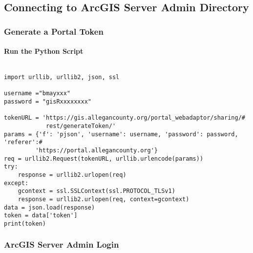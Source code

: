%
%
%
%
% 
%
\subsection{Connecting to ArcGIS Server Admin Directory}

\subsubsection{Generate a Portal Token}

\paragraph{Run the Python Script}

\begin{verbatim}

import urllib, urllib2, json, ssl

username ="bmayxxx"
password = "gisRxxxxxxxx"

tokenURL = 'https://gis.allegancounty.org/portal_webadaptor/sharing/#
            rest/generateToken/'
params = {'f': 'pjson', 'username': username, 'password': password, 'referer':#
         'https://portal.allegancounty.org'}
req = urllib2.Request(tokenURL, urllib.urlencode(params))
try:
    response = urllib2.urlopen(req)
except:
    gcontext = ssl.SSLContext(ssl.PROTOCOL_TLSv1)
    response = urllib2.urlopen(req, context=gcontext)
data = json.load(response)
token = data['token']
print(token)

\end{verbatim}

{\bigbtn{}}

\clearpage

\subsubsection{ArcGIS Server Admin Login}

